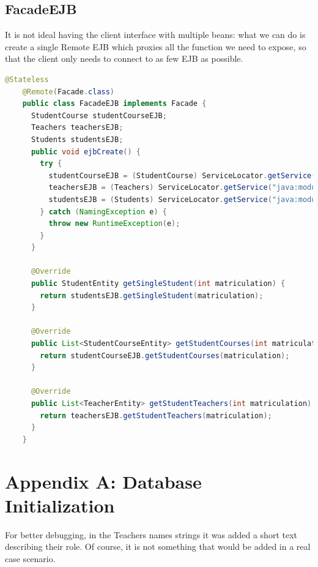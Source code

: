 \documentclass[12pt, a4paper]{article}
\begin{document}
  \subsection{FacadeEJB}
  It is not ideal having the client interface with multiple beans: what we can do is create a single Remote EJB which proxies all the function we need to expose, so that the client only needs to connect to as few EJB as possible.
  \begin{lstlisting}[language=java, caption={FacadeEJB}]
    @Stateless
    @Remote(Facade.class)
    public class FacadeEJB implements Facade {
      StudentCourse studentCourseEJB;
      Teachers teachersEJB;
      Students studentsEJB;
      public void ejbCreate() {
        try {
          studentCourseEJB = (StudentCourse) ServiceLocator.getService("java:module/StudentCourseEJB!it.marrocco.marroccoass4_2server.ejb.StudentCourse");
          teachersEJB = (Teachers) ServiceLocator.getService("java:module/TeachersEJB!it.marrocco.marroccoass4_2server.ejb.Teachers");
          studentsEJB = (Students) ServiceLocator.getService("java:module/StudentsEJB!it.marrocco.marroccoass4_2server.ejb.Students");
        } catch (NamingException e) {
          throw new RuntimeException(e);
        }
      }
  
      @Override
      public StudentEntity getSingleStudent(int matriculation) {
        return studentsEJB.getSingleStudent(matriculation);
      }
  
      @Override
      public List<StudentCourseEntity> getStudentCourses(int matriculation) {
        return studentCourseEJB.getStudentCourses(matriculation);
      }
  
      @Override
      public List<TeacherEntity> getStudentTeachers(int matriculation) {
        return teachersEJB.getStudentTeachers(matriculation);
      }
    }\end{lstlisting}

  

  \pagebreak
  \section{Appendix A: Database Initialization}
  For better debugging, in the Teachers names strings it was added a short text describing their role. Of course, it is not something that would be added in a real case scenario.
\end{document}

